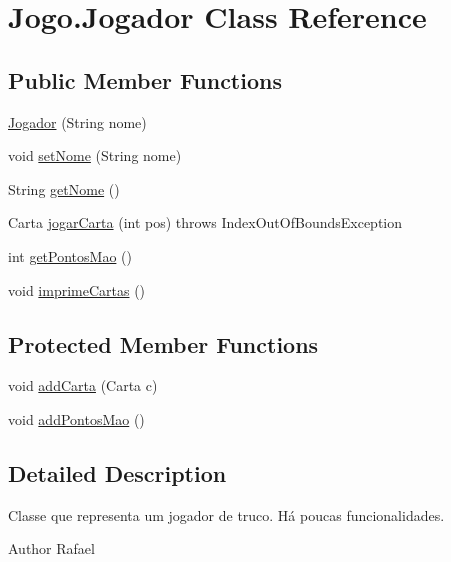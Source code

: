 \hypertarget{class_jogo_1_1_jogador}{
\section{Jogo.Jogador Class Reference}
\label{class_jogo_1_1_jogador}
}
\subsection*{Public Member Functions}
\begin{DoxyCompactItemize}
\item 
\hyperlink{class_jogo_1_1_jogador_aba392674ff42987abf090dd991095dbb}{Jogador} (String nome)
\item 
void \hyperlink{class_jogo_1_1_jogador_a7ae51483d75a9c7cad565388156d1c5d}{setNome} (String nome)
\item 
String \hyperlink{class_jogo_1_1_jogador_a6f8ba8cac4fcfe8cc21b9839a6628690}{getNome} ()
\item 
Carta \hyperlink{class_jogo_1_1_jogador_ad0c46e37fd89e6727dd00bbf4750ac5b}{jogarCarta} (int pos)  throws IndexOutOfBoundsException
\item 
int \hyperlink{class_jogo_1_1_jogador_a52ccd5124c9c5900dded54b12019fbda}{getPontosMao} ()
\item 
void \hyperlink{class_jogo_1_1_jogador_aa73fb134eeb0bb6f77d2083836ad5ea0}{imprimeCartas} ()
\end{DoxyCompactItemize}
\subsection*{Protected Member Functions}
\begin{DoxyCompactItemize}
\item 
void \hyperlink{class_jogo_1_1_jogador_af81fa31e4eae39bb4d2a808281305ec0}{addCarta} (Carta c)
\item 
void \hyperlink{class_jogo_1_1_jogador_a4207d04ef9ce96274fadda312df7fa63}{addPontosMao} ()
\end{DoxyCompactItemize}


\subsection{Detailed Description}
Classe que representa um jogador de truco. Há poucas funcionalidades. \begin{DoxyAuthor}{Author}
Rafael 
\end{DoxyAuthor}


